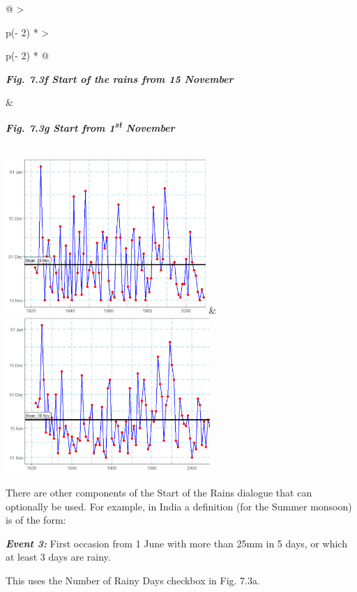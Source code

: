 \documentclass[
  letterpaper,
  DIV=11,
  numbers=noendperiod]{scrreprt}
\begin{document}
\begin{longtable}[]{@{}
  >{\raggedright\arraybackslash}p{(\columnwidth - 2\tabcolsep) * }
  >{\raggedright\arraybackslash}p{(\columnwidth - 2\tabcolsep) * }@{}}
\toprule\noalign{}
\begin{minipage}[b]{\linewidth}\raggedright
\textbf{\emph{Fig. 7.3f Start of the rains from 15 November}}
\end{minipage} & \begin{minipage}[b]{\linewidth}\raggedright
\textbf{\emph{Fig. 7.3g Start from 1\textsuperscript{st} November}}
\end{minipage} \\
\midrule\noalign{}
\endhead
\bottomrule\noalign{}
\endlastfoot
\includegraphics[width=2.98512in,height=2.32565in]{figures/Fig7.3f.png}
&
\includegraphics[width=3.05344in,height=2.33017in]{figures/Fig7.3g.png} \\
\end{longtable}

There are other components of the Start of the Rains dialogue that can
optionally be used. For example, in India a definition (for the Summer
monsoon) is of the form:

\textbf{\emph{Event 3:}} First occasion from 1 June with more than 25mm
in 5 days, or which at least 3 days are rainy.

This uses the Number of Rainy Days checkbox in Fig. 7.3a.
\end{document}
